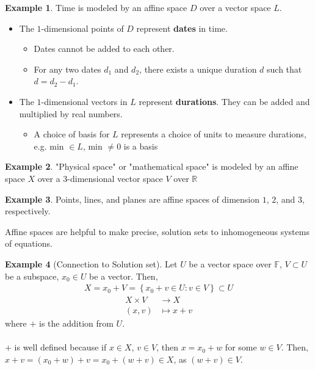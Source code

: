 \documentclass[letterpaper,12pt]{article}
\theoremstyle{definition}
\newtheorem*{example}{Example}
\newcommand{\set}[1]{\left\{ #1 \right\}}
\begin{document}
\begin{example}
Time is modeled by an affine space $D$ over a vector space $L$.
\begin{itemize}
    \item The $1$-dimensional points of $D$ represent \textbf{dates} in time.
    \begin{itemize}
        \item Dates cannot be added to each other.
        \item For any two dates $d_1$ and $d_2$, there exists a unique duration $d$ such that $d = d_2 - d_1$.
    \end{itemize}
    \item The $1$-dimensional vectors in $L$ represent \textbf{durations}. They can be added and multiplied by real numbers.
    \begin{itemize}
        \item A choice of basis for $L$ represents a choice of units to measure durations, e.g. min $\in L$, min $\neq 0$ is a basis
    \end{itemize}
\end{itemize}
\end{example}

\begin{example}
"Physical space" or "mathematical space" is modeled by an affine space $X$ over a 3-dimensional vector space $V$ over $\mathbb{R}$
\end{example}

\begin{example}
Points, lines, and planes are affine spaces of dimension $1$, $2$, and $3$, respectively.
\end{example}


Affine spaces are helpful to make precise, solution sets to inhomogeneous systems of equations.
\begin{example}[Connection to Solution set]
Let $U$ be a vector space over $\mathbb{F}$, $V \subset U$ be a subspace, $x_0 \in U$ be a vector. Then,
\begin{align*}
    X = x_0 + V = \set{x_0 + v \in U : v \in V} \subset U
\end{align*}
\begin{align*}
    X \times V & \longrightarrow X \\
    (x,v) & \longmapsto x + v
\end{align*}
where $+$ is the addition from $U$.
\\ \\ $+$ is well defined because if $x \in X$, $v \in V$, then $x = x_0 + w$ for some $w \in V$. Then, $x + v = (x_0 + w) + v = x_0 + (w + v) \in X$, as $(w + v) \in V$.
\end{example}
\end{document}
